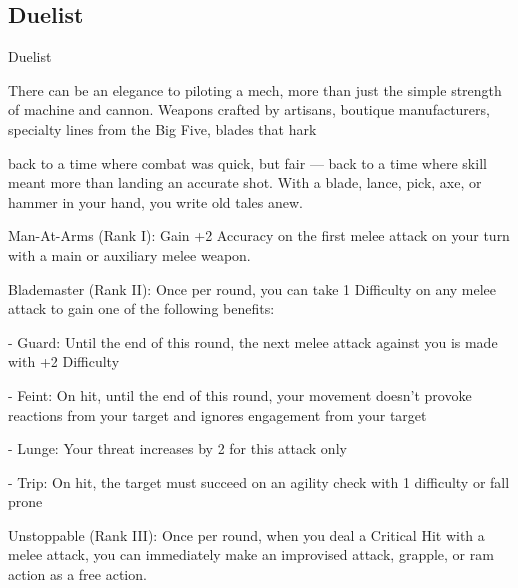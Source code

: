 \subsection{Duelist}

                                                     Duelist  

There can be an elegance to piloting a mech, more than just the simple strength of machine and cannon.  
Weapons crafted by artisans, boutique manufacturers, specialty lines from the Big Five, blades that hark  

back to a time where combat was quick, but fair — back to a time where skill meant more than landing an  
accurate shot. With a blade, lance, pick, axe, or hammer in your hand, you write old tales anew.  

Man-At-Arms (Rank I): Gain +2 Accuracy on the first melee attack on your turn with a main or  
auxiliary melee weapon.
 
Blademaster (Rank II): Once per round, you can take 1 Difficulty on any melee attack to gain  
one of the following benefits:
 
     -   Guard: Until the end of this round, the next melee attack against you is made with +2  
         Difficulty
 
     -   Feint: On hit, until the end of this round, your movement doesn't provoke reactions from  
         your target and ignores engagement from your target
 
     -   Lunge: Your threat increases by 2 for this attack only
 
     -   Trip: On hit, the target must succeed on an agility check with 1 difficulty or fall prone
 
Unstoppable (Rank III): Once per round, when you deal a Critical Hit with a melee attack, you  
can immediately make an improvised attack, grapple, or ram action as a free action.
 